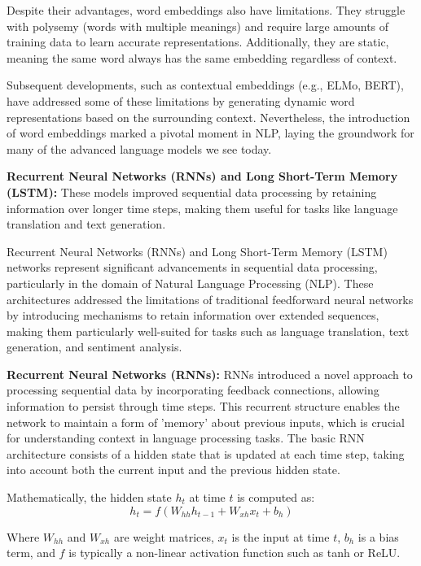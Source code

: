 Despite their advantages, word embeddings also have limitations. They struggle with polysemy (words with multiple meanings) and require large amounts of training data to learn accurate representations. Additionally, they are static, meaning the same word always has the same embedding regardless of context.

Subsequent developments, such as contextual embeddings (e.g., ELMo, BERT), have addressed some of these limitations by generating dynamic word representations based on the surrounding context. Nevertheless, the introduction of word embeddings marked a pivotal moment in NLP, laying the groundwork for many of the advanced language models we see today.

\textbf{Recurrent Neural Networks (RNNs) and Long Short-Term Memory (LSTM):} These models improved sequential data processing by retaining information over longer time steps, making them useful for tasks like language translation and text generation.

Recurrent Neural Networks (RNNs) and Long Short-Term Memory (LSTM) networks represent significant advancements in sequential data processing, particularly in the domain of Natural Language Processing (NLP). These architectures addressed the limitations of traditional feedforward neural networks by introducing mechanisms to retain information over extended sequences, making them particularly well-suited for tasks such as language translation, text generation, and sentiment analysis.

\textbf{Recurrent Neural Networks (RNNs):}
RNNs introduced a novel approach to processing sequential data by incorporating feedback connections, allowing information to persist through time steps. This recurrent structure enables the network to maintain a form of 'memory' about previous inputs, which is crucial for understanding context in language processing tasks. The basic RNN architecture consists of a hidden state that is updated at each time step, taking into account both the current input and the previous hidden state.

Mathematically, the hidden state $h_t$ at time $t$ is computed as:
\begin{equation}
    h_t = f(W_{hh}h_{t-1} + W_{xh}x_t + b_h)
\end{equation}

Where $W_{hh}$ and $W_{xh}$ are weight matrices, $x_t$ is the input at time $t$, $b_h$ is a bias term, and $f$ is typically a non-linear activation function such as tanh or ReLU.

